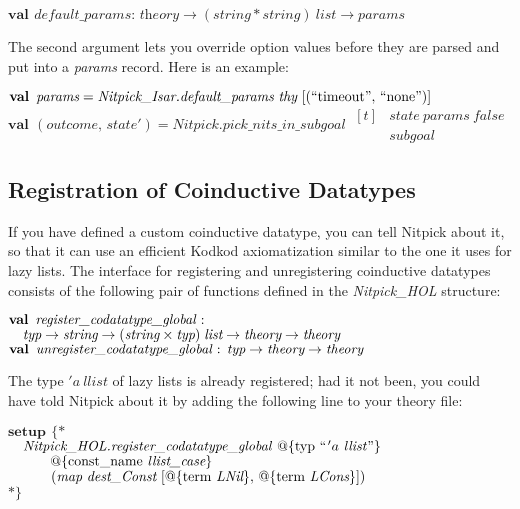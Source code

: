 \documentclass[a4paper,12pt]{article}
\begin{document}
\prew
$\textbf{val}\,~\textit{default\_params} :\,
\textit{theory} \rightarrow (\textit{string} * \textit{string})~\textit{list} \rightarrow \textit{params}$
\postw

The second argument lets you override option values before they are parsed and
put into a \textit{params} record. Here is an example:

\prew
$\textbf{val}\,~\textit{params} = \textit{Nitpick\_Isar.default\_params}~\textit{thy}~[(\textrm{``}\textrm{timeout\/}\textrm{''},\, \textrm{``}\textrm{none}\textrm{''})]$ \\
$\textbf{val}\,~(\textit{outcome},\, \textit{state}') = \textit{Nitpick.pick\_nits\_in\_subgoal}~\begin{aligned}[t]
& \textit{state}~\textit{params}~\textit{false} \\[-2pt]
& \textit{subgoal}\end{aligned}$
\postw

\let\antiq=\textrm

\subsection{Registration of Coinductive Datatypes}
\label{registration-of-coinductive-datatypes}

If you have defined a custom coinductive datatype, you can tell Nitpick about
it, so that it can use an efficient Kodkod axiomatization similar to the one it
uses for lazy lists. The interface for registering and unregistering coinductive
datatypes consists of the following pair of functions defined in the
\textit{Nitpick\_HOL} structure:

\prew
$\textbf{val}\,~\textit{register\_codatatype\_global\/} : {}$ \\
$\hbox{}\quad\textit{typ} \rightarrow \textit{string} \rightarrow (\textit{string} \times \textit{typ})\;\textit{list} \rightarrow \textit{theory} \rightarrow \textit{theory}$ \\
$\textbf{val}\,~\textit{unregister\_codatatype\_global\/} :\,
\textit{typ} \rightarrow \textit{theory} \rightarrow \textit{theory}$
\postw

The type $'a~\textit{llist}$ of lazy lists is already registered; had it
not been, you could have told Nitpick about it by adding the following line
to your theory file:

\prew
$\textbf{setup}~\,\{{*}$ \\
$\hbox{}\quad\textit{Nitpick\_HOL.register\_codatatype\_global\/}~@\{\antiq{typ}~``\kern1pt'a~\textit{llist\/}\textrm{''}\}$ \\
$\hbox{}\qquad\quad @\{\antiq{const\_name}~ \textit{llist\_case}\}$ \\
$\hbox{}\qquad\quad (\textit{map}~\textit{dest\_Const}~[@\{\antiq{term}~\textit{LNil}\},\, @\{\antiq{term}~\textit{LCons}\}])$ \\
${*}\}$
\postw
\end{document}
